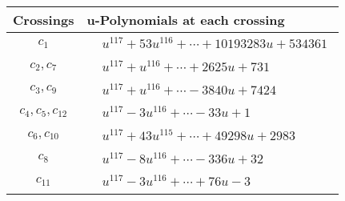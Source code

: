 \documentclass[1p]{elsarticle_modified}
\theoremstyle{definition}
\begin{document}
\begin{tabular}{m{50pt}|m{274pt}}
Crossings & \hspace{64pt}u-Polynomials at each crossing \\
\hline $$\begin{aligned}c_{1}\end{aligned}$$&$\begin{aligned}
&u^{117}+53 u^{116}+\cdots+10193283 u+534361
\end{aligned}$\\
\hline $$\begin{aligned}c_{2},c_{7}\end{aligned}$$&$\begin{aligned}
&u^{117}+u^{116}+\cdots+2625 u+731
\end{aligned}$\\
\hline $$\begin{aligned}c_{3},c_{9}\end{aligned}$$&$\begin{aligned}
&u^{117}+u^{116}+\cdots-3840 u+7424
\end{aligned}$\\
\hline $$\begin{aligned}c_{4},c_{5},c_{12}\end{aligned}$$&$\begin{aligned}
&u^{117}-3 u^{116}+\cdots-33 u+1
\end{aligned}$\\
\hline $$\begin{aligned}c_{6},c_{10}\end{aligned}$$&$\begin{aligned}
&u^{117}+43 u^{115}+\cdots+49298 u+2983
\end{aligned}$\\
\hline $$\begin{aligned}c_{8}\end{aligned}$$&$\begin{aligned}
&u^{117}-8 u^{116}+\cdots-336 u+32
\end{aligned}$\\
\hline $$\begin{aligned}c_{11}\end{aligned}$$&$\begin{aligned}
&u^{117}-3 u^{116}+\cdots+76 u-3
\end{aligned}$\\
\hline
\end{tabular}\\~\\
\end{document}
